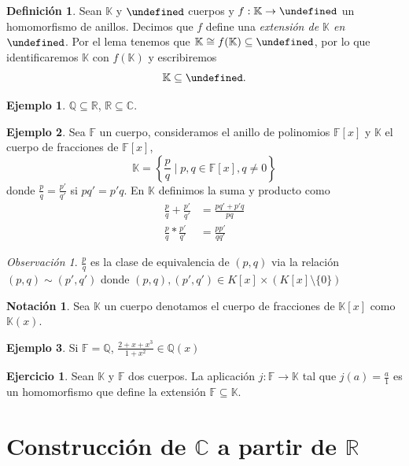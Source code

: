 \documentclass[10pt, spanish]{report}
\theoremstyle{definition}
\newtheorem*{defin}{Definición}
\newtheorem*{notacion}{Notación}
\newtheorem*{ej}{Ejemplo}
\theoremstyle{custom}
\newtheorem*{ejer}{Ejercicio}
\theoremstyle{remark}
\newtheorem*{obs}{Observación}
\newcommand{\Q}{\mathbb{Q}}
\newcommand{\R}{\mathbb{R}}
\newcommand{\C}{\mathbb{C}}
\newcommand{\F}{\mathbb{F}}
\newcommand{\K}{\mathbb{K}}
\let\L\undefined
\newcommand{\L}{\mathbb{L}}
\newcommand{\fecha}[1]{\marginpar{\underline{\footnotesize{#1}}}}
\begin{document}
\begin{defin}
    Sean $\K$ y $\L$ cuerpos y $f:\K\to\L$ un homomorfismo de anillos. Decimos
    que $f$ define una \textit{extensión de $\K$ en $\L$}.
    Por el lema tenemos que $\K\cong f(\K)\subseteq \L$, por lo que
    identificaremos $\K$ con $f(\K)$ y escribiremos \[\K\subseteq \L.\]
\end{defin}

\begin{ej}
    $\Q\subseteq\R$, $\R\subseteq\C$.
\end{ej}

\fecha{16/02}

\begin{ej}
    Sea $\F$ un cuerpo, consideramos el anillo de polinomios $\F[x]$ y
    $\K$ el cuerpo de fracciones de $\F[x]$,
    \[\K=\left\{ \frac{p}{q}\mid p,q\in \F[x], q\neq 0 \right\}\]
    donde $\frac{p}{q} = \frac{p'}{q'}$ si $pq'=p'q$.
    En $\K$ definimos la suma y producto como
    \begin{align*}
        \frac{p}{q}+\frac{p'}{q'}&=\frac{pq'+p'q}{pq}\\
        \frac{p}{q}*\frac{p'}{q'}&=\frac{pp'}{qq'}
    \end{align*}
\end{ej}

\begin{obs}
    $\frac{p}{q}$ es la clase de equivalencia de $(p,q)$ via la relación
    $(p,q)\sim(p',q')$ donde $(p,q),(p',q')\in K[x]\times(K[x]\setminus\{0\})$
\end{obs}

\begin{notacion}
    Sea $\K$ un cuerpo denotamos el cuerpo de fracciones de $\K[x]$ como
    $\K(x)$.
\end{notacion}

\begin{ej}
    Si $\F=\Q$, $\frac{2+x+x^3}{1+x^2}\in \Q(x)$
\end{ej}

\begin{ejer}
    Sean $\K$ y $\F$ dos cuerpos. La aplicación $j:\F\to\K$ tal que $j(a)=
    \frac{a}{1}$ es un homomorfismo que define la extensión $\F\subseteq \K$.
\end{ejer}


\section{Construcción de $\C$ a partir de $\R$}
\end{document}
